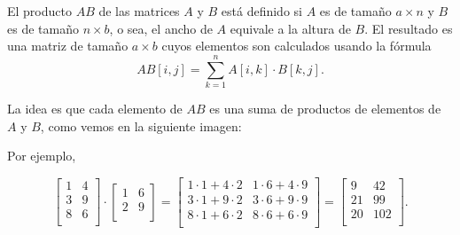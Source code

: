 
El producto $AB$ de las matrices $A$ y $B$ está definido si $A$ es de tamaño
$a \times n$ y $B$ es de tamaño $n \times b$, o sea, el ancho de $A$ equivale
a la altura de $B$. El resultado es una matriz de tamaño $a \times b$ cuyos
elementos son calculados usando la fórmula
\[
    AB[i,j] = \sum_{k=1}^n A[i,k] \cdot B[k,j].
\]

La idea es que cada elemento de $AB$ es una suma de productos de elementos de
$A$ y $B$, como vemos en la siguiente imagen:

\begin{center}
\end{center}

Por ejemplo,

\[
    \begin{bmatrix}
        1 & 4 \\
        3 & 9 \\
        8 & 6 \\
    \end{bmatrix}
    \cdot
    \begin{bmatrix}
        1 & 6 \\
        2 & 9 \\
    \end{bmatrix}
    =
    \begin{bmatrix}
        1 \cdot 1 + 4 \cdot 2 & 1 \cdot 6 + 4 \cdot 9 \\
        3 \cdot 1 + 9 \cdot 2 & 3 \cdot 6 + 9 \cdot 9 \\
        8 \cdot 1 + 6 \cdot 2 & 8 \cdot 6 + 6 \cdot 9 \\
    \end{bmatrix}
    =
    \begin{bmatrix}
        9  & 42  \\
        21 & 99  \\
        20 & 102 \\
    \end{bmatrix}.
\]

